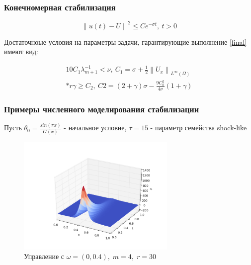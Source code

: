 \documentclass{beamer}
\newcommand{\norm}[1]{\left\lVert#1\right\rVert}
\begin{document}
\begin{frame}
\frametitle{Конечномерная стабилизация}

\begin{block}{}
\begin{equation}\label{final}
    \norm{u(t) - U}^2 \le C e^{-\sigma t}, \ t > 0
\end{equation}
\end{block}

Достаточноые условия на параметры задачи, гарантирующие выполнение \eqref{final}
имеют вид:

\begin{block}{}
\begin{gather*}
    10C_1 \lambda_{m + 1}^{-1} < \nu, \ C_1 = \sigma + \frac{1}{2}
    \norm{U_x}_{L^{\infty}(\Omega)} \\*
    r\gamma \ge C_2, \ C2 = (2 + \gamma)\sigma - \frac{9C_0^2}{4\nu}(1 + \gamma)
\end{gather*}
\end{block}

\end{frame}

\begin{frame}
\frametitle{Примеры численного моделирования стабилизации}

Пусть $\theta_0 = \frac{sin(\pi x)}{G(x)}$ - начальное условие, $\tau = 15$
- параметр семейства shock-like

\begin{figure}[H]
  \centering
  \includegraphics[width=3in]{re_s15}
  \caption{Управление с $\omega = (0, 0.4), \; m = 4, \; r = 30$}
  \label{fig:test2}
\end{figure}

\end{frame}
\end{document}
